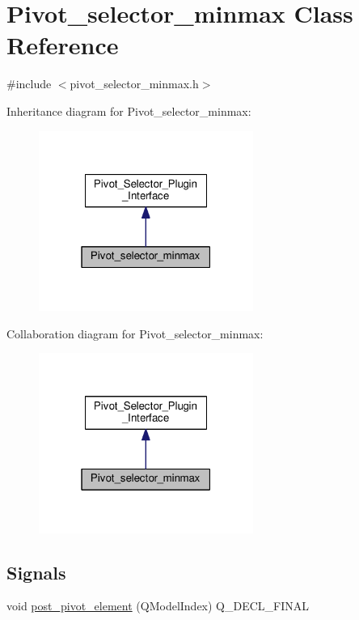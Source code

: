 \hypertarget{classPivot__selector__minmax}{}\section{Pivot\+\_\+selector\+\_\+minmax Class Reference}
\label{classPivot__selector__minmax}


{\ttfamily \#include $<$pivot\+\_\+selector\+\_\+minmax.\+h$>$}



Inheritance diagram for Pivot\+\_\+selector\+\_\+minmax\+:\nopagebreak
\begin{figure}[H]
\begin{center}
\leavevmode
\includegraphics[width=199pt]{classPivot__selector__minmax__inherit__graph}
\end{center}
\end{figure}


Collaboration diagram for Pivot\+\_\+selector\+\_\+minmax\+:\nopagebreak
\begin{figure}[H]
\begin{center}
\leavevmode
\includegraphics[width=199pt]{classPivot__selector__minmax__coll__graph}
\end{center}
\end{figure}
\subsection*{Signals}
\begin{DoxyCompactItemize}
\item 
void \hyperlink{classPivot__selector__minmax_a7e91c9552fdb57e1f09c525b0071d5cc}{post\+\_\+pivot\+\_\+element} (Q\+Model\+Index) Q\+\_\+\+D\+E\+C\+L\+\_\+\+F\+I\+N\+AL
\end{DoxyCompactItemize}
